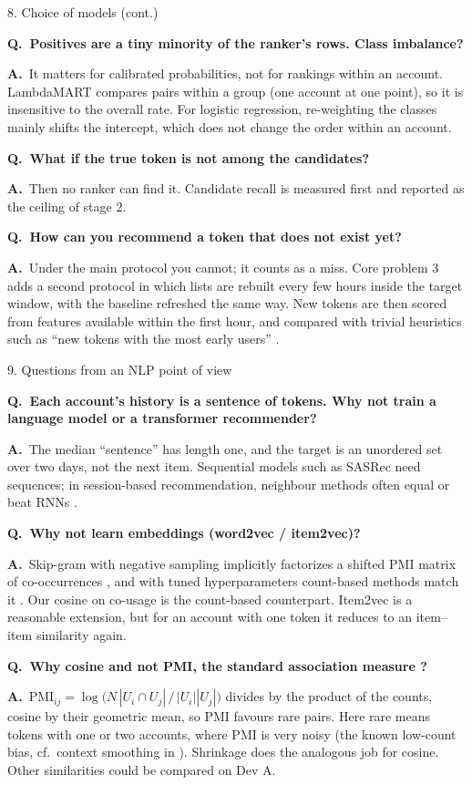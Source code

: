 \documentclass[aspectratio=169,10pt]{beamer}
\newcommand{\Q}[1]{\par{\color{orange}\bfseries Q.\ #1}\par\smallskip}
\newcommand{\A}{{\color{teal}\bfseries A.}\ }
\newcommand{\toindex}{\hfill\hyperlink{index}{\beamerreturnbutton{index}}}
\newcommand{\qsep}{\par\medskip{\color{grey!40}\hrule}\medskip}
\begin{document}
\begin{frame}{8. Choice of models (cont.) \toindex}
  \footnotesize
  \Q{Positives are a tiny minority of the ranker's rows. Class imbalance?}
  \A It matters for calibrated probabilities, not for rankings within an account. LambdaMART compares pairs within a group (one account at one point), so it is insensitive to the overall rate. For logistic regression, re-weighting the classes mainly shifts the intercept, which does not change the order within an account.
  \qsep
  \Q{What if the true token is not among the candidates?}
  \A Then no ranker can find it. Candidate recall is measured first and reported as the ceiling of stage 2.
  \qsep
  \Q{How can you recommend a token that does not exist yet?}
  \A Under the main protocol you cannot; it counts as a miss. Core problem 3 adds a second protocol in which lists are rebuilt every few hours inside the target window, with the baseline refreshed the same way. New tokens are then scored from features available within the first hour, and compared with trivial heuristics such as ``new tokens with the most early users'' \cite{schein2002}.
\end{frame}

\begin{frame}[label=qnlp]{9. Questions from an NLP point of view \toindex}
  \footnotesize
  \Q{Each account's history is a sentence of tokens. Why not train a language model or a transformer recommender?}
  \A The median ``sentence'' has length one, and the target is an unordered set over two days, not the next item. Sequential models such as SASRec \cite{kang2018} need sequences; in session-based recommendation, neighbour methods often equal or beat RNNs \cite{ludewig2018}.
  \qsep
  \Q{Why not learn embeddings (word2vec / item2vec)?}
  \A Skip-gram with negative sampling implicitly factorizes a shifted PMI matrix of co-occurrences \cite{levy2014}, and with tuned hyperparameters count-based methods match it \cite{levy2015}. Our cosine on co-usage is the count-based counterpart. Item2vec \cite{barkan2016} is a reasonable extension, but for an account with one token it reduces to an item--item similarity again.
  \qsep
  \Q{Why cosine and not PMI, the standard association measure \cite{churchhanks1990}?}
  \A $\mathrm{PMI}_{ij} = \log \bigl(N\,|U_i\cap U_j| \,/\, |U_i||U_j|\bigr)$ divides by the product of the counts, cosine by their geometric mean, so PMI favours rare pairs. Here rare means tokens with one or two accounts, where PMI is very noisy (the known low-count bias, cf.\ context smoothing in \cite{levy2015}). Shrinkage does the analogous job for cosine. Other similarities could be compared on Dev A.
\end{frame}
\end{document}
